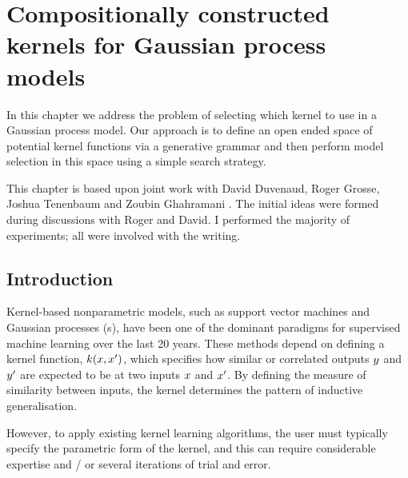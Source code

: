 
\inbpdocument

\chapter{Compositionally constructed kernels for Gaussian process models}
\label{ch:construction}

In this chapter we address the problem of selecting which kernel to use in a Gaussian process model.
Our approach is to define an open ended space of potential kernel functions via a generative grammar and then perform model selection in this space using a simple search strategy.

This chapter is based upon joint work with David Duvenaud, Roger Grosse, Joshua Tenenbaum and Zoubin Ghahramani \citep{Duvenaud2013-dn}.
The initial ideas were formed during discussions with Roger and David.
I performed the majority of experiments; all were involved with the writing.

\section{Introduction}

Kernel-based nonparametric models, such as support vector machines and Gaussian processes (\gp{}s), have been one of the dominant paradigms for supervised machine learning over the last 20 years.
These methods depend on defining a kernel function, $k(x,x')$, which specifies how similar or correlated outputs $y$ and $y'$ are expected to be at two inputs $x$ and $x'$.
By defining the measure of similarity between inputs, the kernel determines the pattern of inductive generalisation.


However, to apply existing kernel learning algorithms, the user must typically specify the parametric form of the kernel, and this can require considerable expertise and / or several iterations of trial and error.

